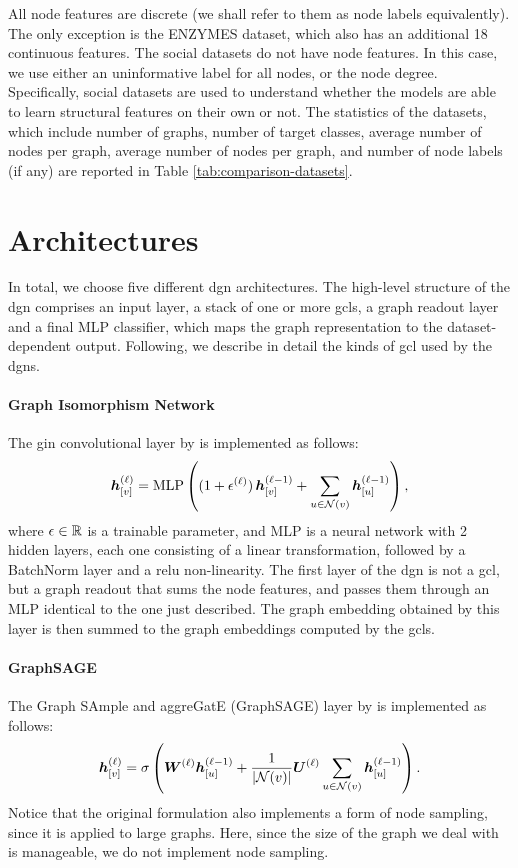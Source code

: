 All node features are discrete (we shall refer to them as node labels equivalently). The only exception is the ENZYMES dataset, which also has an additional 18 continuous features. The social datasets do not have node features. In this case, we use either an uninformative label for all nodes, or the node degree. Specifically, social datasets are used to understand whether the models are able to learn structural features on their own or not. The statistics of the datasets, which include number of graphs, number of target classes, average number of nodes per graph, average number of nodes per graph, and number of node labels (if any) are reported in Table \ref{tab:comparison-datasets}.


\section{Architectures}\label{sec:comparison-architectures}
In total, we choose five different \gls{dgn} architectures. The high-level structure of the \gls{dgn} comprises an input layer, a stack of one or more \glspl{gcl}, a graph readout layer and a final MLP classifier, which maps the graph representation to the dataset-dependent output. Following, we describe in detail the kinds of \gls{gcl} used by the \glspl{dgn}.

\paragraph{Graph Isomorphism Network} The \gls{gin} convolutional layer by \citet{xu2019gin} is implemented as follows:
$$\StateVector{v}{\ell} = \Fun{MLP} \Par{(1 + \epsilon^{(\ell)})\,\Elem{h}{v}^{(\ell-1)} + \sum_{u \in \Neigh(v)} \StateVector{u}{\ell-1}},$$
where $\epsilon \in \mathbb{R}$ is a trainable parameter, and MLP is a neural network with 2 hidden layers, each one consisting of a linear transformation, followed by a BatchNorm layer and a \gls{relu} non-linearity. The first layer of the \gls{dgn} is not a \gls{gcl}, but a graph readout that sums the node features, and passes them through an MLP identical to the one just described. The graph embedding obtained by this layer is then summed to the graph embeddings computed by the \glspl{gcl}.

\paragraph{GraphSAGE}
The Graph SAmple and aggreGatE (GraphSAGE) layer by \cite{hamilton2017graphsage} is implemented as follows:
$$\StateVector{v}{\ell} = \sigma\Par{\LayerMatrix{w}{\ell}\StateVector{u}{\ell-1} + \frac{1}{|\Neigh(v)|} \LayerMatrix{U}{\ell} \sum_{u \in \Neigh(v)} \StateVector{u}{\ell-1}}.$$
Notice that the original formulation also implements a form of node sampling, since it is applied to large graphs. Here, since the size of the graph we deal with is manageable, we do not implement node sampling.

